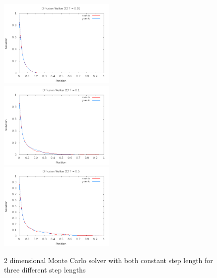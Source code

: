 \documentclass[a4wide,12pt]{article}
\begin{document}
\begin{figure}[p]
 \includegraphics[width=0.5\textwidth]{Walker2DT0_01}
 \includegraphics[width=0.5\textwidth]{Walker2DT0_1}
 \includegraphics[width=0.5\textwidth]{Walker2DT0_5}
 \caption{2 dimensional Monte Carlo solver with both constant step length for three different step lengths}
 \label{fig:07}
\end{figure}
\end{document}

